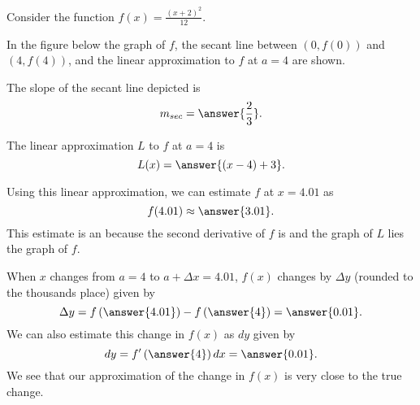 \documentclass{ximera}
\author{Nela Lakos \and Kyle Parsons}
\begin{document}
\begin{exercise}

Consider the function $f(x) = \frac{(x+2)^2}{12}$.

In the figure below the graph of $f$, the secant line between $(0,f(0))$ and $(4,f(4))$, and the linear approximation to $f$ at $a=4$ are shown.

\begin{image}
\end{image}

The slope of the secant line depicted is
\[
m_{sec} = \answer{\frac{2}{3}}.
\]

The linear approximation $L$ to $f$ at $a=4$ is
\[
L(x) = \answer{(x-4) + 3}.
\]

Using this linear approximation, we can estimate $f$ at $x=4.01$ as
\[
f(4.01) \approx \answer{3.01}.
\]
This estimate is an  because the second derivative of $f$ is  and the graph of $L$ lies  the graph of $f$.

When $x$ changes from $a=4$ to $a+\Delta x=4.01$, $f(x)$ changes by $\Delta y$ (rounded to the thousands place) given by
\[
\Delta y = f\left(\answer{4.01}\right) - f\left(\answer{4}\right) = \answer{0.01}.
\]
We can also estimate this change in $f(x)$ as $dy$ given by
\[
dy = f'\left(\answer{4}\right) dx = \answer{0.01}.
\]
We see that our approximation of the change in $f(x)$ is very close to the true change.

\end{exercise}
\end{document}
